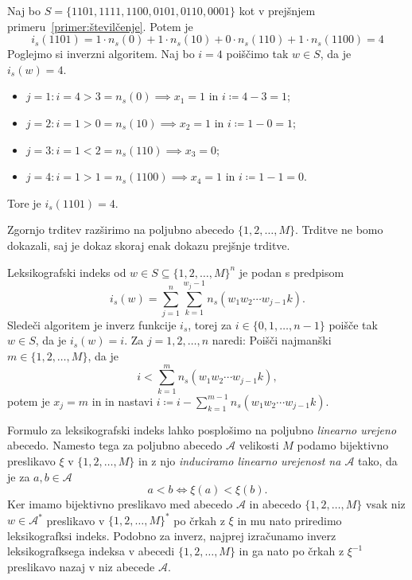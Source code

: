 \documentclass[fin1, tisk]{fmfdelo}
\newcommand{\A}{\mathcal{A}}
\theoremstyle{definition}
\begin{document}
\begin{primer}
    Naj bo $S = \{ 1101, 1111, 1100, 0101, 0110, 0001 \}$ kot v prejšnjem 
    primeru~\ref{primer:številčenje}. Potem je 
    \[
        i_s(1101) = 1 \cdot n_s(0) + 1 \cdot n_s(10) + 0 \cdot n_s(110) + 1 \cdot n_s(1100) = 4
    \]
    Poglejmo si inverzni algoritem. Naj bo $i = 4$ poiščimo tak $w \in S$, da je $i_s(w) = 4$.
    \begin{itemize}
        \item $j=1 \colon i = 4 > 3 = n_s(0) \implies x_1 = 1$ in $i \coloneq 4 - 3 = 1$;
        \item $j=2 \colon i = 1 > 0 = n_s(10) \implies x_2 = 1$ in $i \coloneq 1 - 0 = 1$;
        \item $j=3 \colon i = 1 < 2 = n_s(110) \implies x_3 = 0$;
        \item $j=4 \colon i = 1 > 1 = n_s(1100) \implies x_4 = 1$ in $i \coloneq 1 - 1 = 0$.
    \end{itemize}
    Tore je $i_s(1101) = 4$.
\end{primer}

Zgornjo trditev razširimo na poljubno abecedo $\{ 1,2, \ldots, M\}$. Trditve ne bomo dokazali,
saj je dokaz skoraj enak dokazu prejšnje trditve.

\begin{trditev}
    Leksikografski indeks od $w \in S \subseteq \{ 1,2, \ldots, M\}^n$ je 
    podan s predpisom
    \[
        i_s(w) = \sum_{j=1}^{n} \sum_{k=1}^{w_j-1} n_s(w_1w_2 \cdots w_{j-1}k).
    \]
    Sledeči algoritem je inverz funkcije $i_s$, torej za $i \in \{ 0, 1, \ldots, n - 1 \}$ 
    poišče tak $w \in S$, da je $i_s(w) = i$. Za $j = 1,2, \ldots, n$ naredi: Poišči najmanški 
    $m \in \{ 1,2, \ldots, M\}$, da je 
    \[
        i < \sum_{k=1}^m n_s(w_1w_2 \cdots w_{j-1}k),
    \]
    potem je $x_j = m$ in in nastavi $i \coloneq i - \sum_{k=1}^{m-1} n_s(w_1w_2 \cdots w_{j-1}k)$.
\end{trditev} 

Formulo za leksikografski indeks lahko posplošimo na poljubno \emph{linearno urejeno} abecedo.
Namesto tega za poljubno abecedo $\A$ velikosti $M$ podamo bijektivno preslikavo $\xi$ v 
$\{ 1,2, \ldots, M\}$ in z njo \emph{induciramo linearno urejenost na $\A$} tako,
da je za $a,b \in \A$
\[
    a < b \iff \xi(a) < \xi(b).
\]
Ker imamo bijektivno preslikavo med abecedo $\A$ in abecedo $\{ 1,2, \ldots, M\}$ vsak niz
$w \in \A^*$ preslikavo v $\{ 1,2, \ldots, M\}^*$ po črkah z $\xi$ in mu nato priredimo 
leksikografksi indeks. Podobno za inverz, najprej izračunamo inverz leksikografksega indeksa 
v abecedi $\{ 1,2, \ldots, M\}$ in ga nato po črkah z $\xi^{-1}$ preslikavo nazaj v niz 
abecede $\A$.
\end{document}
